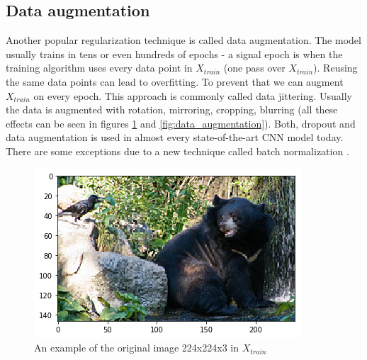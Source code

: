 \documentclass[times, utf8, diplomski]{fer}
\begin{document}
\subsection{Data augmentation}  \label{se:data_augmentation}

Another popular regularization technique is called data augmentation. The model usually trains in tens or even hundreds of epochs - a signal epoch is when the training algorithm uses every data point in $X_{train}$ (one pass over $X_{train}$). Reusing the same data points can lead to overfitting. To prevent that we can augment $X_{train}$ on every epoch. This approach is commonly called data jittering. Usually the data is augmented with rotation, mirroring, cropping, blurring (all these effects can be seen in figures \ref{fig:data_augmentation_figure} and \ref{fig:data_augmentation}). Both, dropout and data augmentation is used in almost every state-of-the-art CNN model today. There are some exceptions due to a new technique called batch normalization \citep{ioffe_batch_2015}.

\begin{figure}
  \includegraphics[scale=0.7]{figures/data_augmentation.png}
  \centering
  \caption{An example of the original image 224x224x3 in $X_{train}$}
  \label{fig:data_augmentation_figure}
\end{figure}
\end{document}
